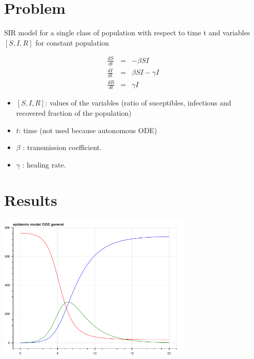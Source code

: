 \documentclass[12pt]{article}
\begin{document}
\section{Problem}
SIR model for a single class of population
with respect to time t and variables $[S, I, R]$ for constant population



\begin{eqnarray}
\frac{dS}{dt} &=& - \beta  S I \\
\frac{dI}{dt} &= &\beta  S I -  \gamma I \\
\frac{dR}{dt} &=& \gamma I
\end{eqnarray}

\begin{itemize}
\item $[S, I, R]$: values of the variables (ratio of suceptibles, infectious and recovered fraction of the population)
\item $t$: time (not used because autonomous ODE)
\item $\beta$ : transmission coefficient.
\item $\gamma$ : healing rate.
\end{itemize}

\section{Results}

\includegraphics[height=7cm]{figure.png}
\end{document}
